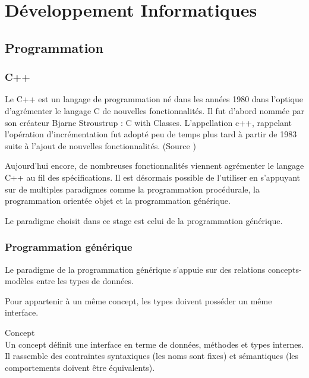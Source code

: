 \section{Développement Informatiques}

\subsection{Programmation}

\subsubsection{C++}


Le C++ est un langage de programmation né dans les années 1980 dans l'optique d'agrémenter le langage C de nouvelles fonctionnalités. Il fut d'abord nommée par son créateur Bjarne Stroustrup : C with Classes. L’appellation c++, rappelant l'opération d'incrémentation fut adopté peu de temps plus tard à partir de 1983 suite à l'ajout de nouvelles fonctionnalités. (Source \cite{Wiki-cpp})

Aujourd'hui encore, de nombreuses fonctionnalités viennent agrémenter le langage C++ au fil des spécifications. Il est désormais possible de l'utiliser en s'appuyant sur de multiples paradigmes comme la programmation procédurale, la programmation orientée objet et la programmation générique.

Le paradigme choisit dans ce stage est celui de la programmation générique. \cite{troussil-cpp}

\subsubsection{Programmation générique}


Le paradigme de la programmation générique s'appuie sur des relations concepts-modèles entre les types de données.  

Pour appartenir à un même concept, les types doivent posséder un même interface. 

\begin{Definition}{Concept}\\
\label{def:cpp-con}
    Un concept définit une interface en terme de données, méthodes et types internes. Il rassemble des contraintes syntaxiques (les noms sont fixes) et sémantiques (les comportements doivent être équivalents). 
\end{Definition}

